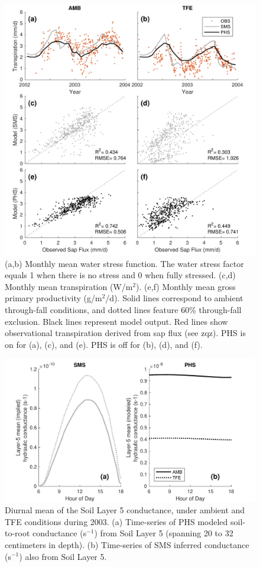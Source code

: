 \documentclass[draft,linenumbers]{agujournal}
\begin{document}
  \clearpage   
  \begin{figure}[h]
     \centering
     \includegraphics[width=30pc]{../figs3/T.pdf}
     \caption{(a,b) Monthly mean water stress function. The water stress factor equals 1 when there is no stress and 0 when fully stressed.
     (c,d) Monthly mean transpiration (W/m$^2$).
     (e,f) Monthly mean gross primary productivity (g/m$^2$/d). 
     Solid lines correspond to ambient through-fall conditions, and dotted lines feature 60\% through-fall exclusion.
     Black lines represent model output.
     Red lines show observational transpiration derived from sap flux (see zqz).
     PHS is on for (a), (c), and (e). PHS is off for (b), (d), and (f).
     }
     \label{fig:t}
  \end{figure}

\clearpage   
  \begin{figure}[h]
     \centering
     \includegraphics[width=30pc]{../figs3/k.pdf}
     \caption{Diurnal mean of the Soil Layer 5 conductance, under ambient and TFE conditions during 2003. 
     (a) Time-series of PHS modeled soil-to-root conductance (s$^{-1}$) from Soil Layer 5 (spanning 20 to 32 centimeters in depth).
     (b) Time-series of SMS inferred conductance (s$^{-1}$) also from Soil Layer 5.
     }
     \label{fig:cond}
  \end{figure}
  
\end{document}

